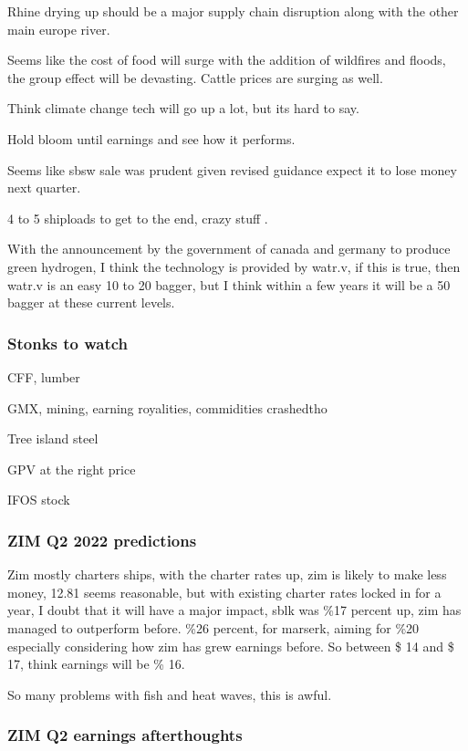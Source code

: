 Rhine drying up should be a major supply chain disruption along with the other main europe river.

Seems like the cost of food will surge with the addition of wildfires and floods, the group effect will be devasting. Cattle prices are surging as well.

Think climate change tech will go up a lot, but its hard to say.

Hold bloom until earnings and see how it performs.

Seems like sbsw sale was prudent given revised guidance expect it to lose money next quarter.


4 to 5 shiploads to get to the end, crazy stuff \cite{youtube_2022}.

With the announcement by the government of canada and germany to produce green hydrogen, I think the technology is provided by watr.v, if this is true, then watr.v is an easy 10 to 20 bagger, but I think within a few years it will be a 50 bagger at these current levels.

\subsubsection{Stonks to watch}

CFF, lumber

GMX, mining, earning royalities, commidities crashedtho

Tree island steel

GPV at the right price

IFOS stock
\subsubsection{ZIM Q2 2022 predictions}

Zim mostly charters ships, with the charter rates up, zim is likely to make less money, 12.81 seems reasonable, but with existing charter rates locked in for a year, I doubt that it will have a major impact, sblk was \%17 percent up, zim has managed to outperform before. \%26 percent, for marserk, aiming for \%20 especially considering how zim has grew earnings before. So between \$ 14 and \$ 17, think earnings will be \% 16.


So many problems with fish and heat waves, this is awful.

\subsubsection{ZIM Q2 earnings afterthoughts} 

